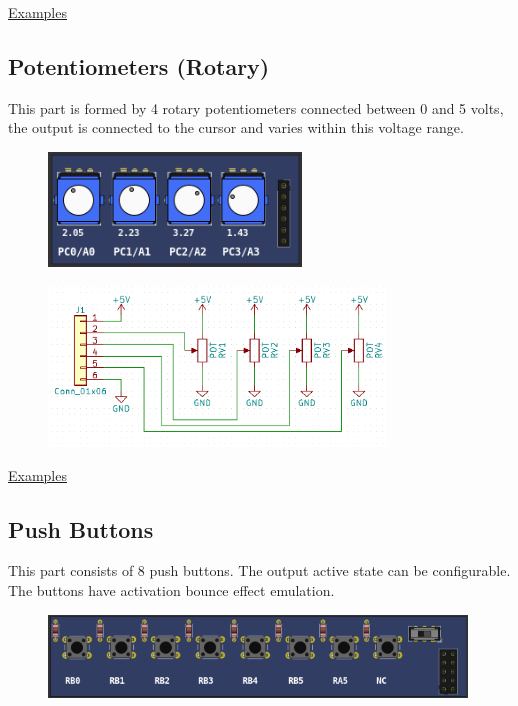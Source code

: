 \href{https://lcgamboa.github.io/picsimlab_examples/parts_Potentiometers.html}{Examples}

\subsection{Potentiometers (Rotary)}

This part is formed by 4 rotary potentiometers connected between 0 and 5 volts, the output is connected to the cursor and varies within this voltage range.
\begin{figure}[H]
\center
\includegraphics[width=0.6\textwidth]{img/part_pot_r.png} 
\end{figure} 

\begin{figure}[H]
\center
\includegraphics[width=0.8\textwidth]{img/part_pot_.png} 
\end{figure} 

\href{https://lcgamboa.github.io/picsimlab_examples/parts_Potentiometers_(Rotary).html}{Examples}

\subsection{Push Buttons}

This part consists of 8 push buttons. The output active state can be configurable.
The buttons have activation bounce effect emulation. 
\begin{figure}[H]
\center
\includegraphics[width=0.99\textwidth]{img/part_buttons.png} 
\end{figure} 

